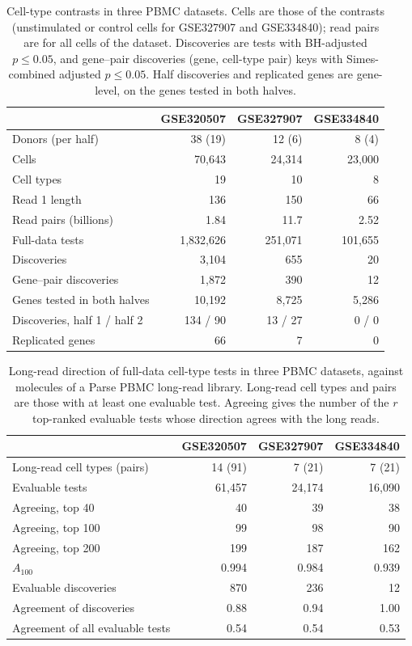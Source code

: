 \documentclass[11pt]{article}
\begin{document}
\begin{table}[ht]
\centering
\small
\begin{tabular}{lrrr}
\toprule
 & GSE320507 & GSE327907 & GSE334840\\
\midrule
Donors (per half) & 38 (19) & 12 (6) & 8 (4)\\
Cells & 70{,}643 & 24{,}314 & 23{,}000\\
Cell types & 19 & 10 & 8\\
Read 1 length & 136 & 150 & 66\\
Read pairs (billions) & 1.84 & 11.7 & 2.52\\
\midrule
Full-data tests & 1{,}832{,}626 & 251{,}071 & 101{,}655\\
Discoveries & 3{,}104 & 655 & 20\\
Gene--pair discoveries & 1{,}872 & 390 & 12\\
\midrule
Genes tested in both halves & 10{,}192 & 8{,}725 & 5{,}286\\
Discoveries, half 1 / half 2 & 134 / 90 & 13 / 27 & 0 / 0\\
Replicated genes & 66 & 7 & 0\\
\bottomrule
\end{tabular}
\caption{Cell-type contrasts in three PBMC datasets. Cells are those of the contrasts (unstimulated or control cells for GSE327907 and GSE334840); read pairs are for all cells of the dataset. Discoveries are tests with BH-adjusted $p\le0.05$, and gene--pair discoveries (gene, cell-type pair) keys with Simes-combined adjusted $p\le0.05$. Half discoveries and replicated genes are gene-level, on the genes tested in both halves.}
\label{tab:pbmc}
\end{table}

\begin{table}[ht]
\centering
\small
\begin{tabular}{lrrr}
\toprule
 & GSE320507 & GSE327907 & GSE334840\\
\midrule
Long-read cell types (pairs) & 14 (91) & 7 (21) & 7 (21)\\
Evaluable tests & 61{,}457 & 24{,}174 & 16{,}090\\
Agreeing, top 40 & 40 & 39 & 38\\
Agreeing, top 100 & 99 & 98 & 90\\
Agreeing, top 200 & 199 & 187 & 162\\
$A_{100}$ & 0.994 & 0.984 & 0.939\\
Evaluable discoveries & 870 & 236 & 12\\
Agreement of discoveries & 0.88 & 0.94 & 1.00\\
Agreement of all evaluable tests & 0.54 & 0.54 & 0.53\\
\bottomrule
\end{tabular}
\caption{Long-read direction of full-data cell-type tests in three PBMC datasets, against molecules of a Parse PBMC long-read library. Long-read cell types and pairs are those with at least one evaluable test. Agreeing gives the number of the $r$ top-ranked evaluable tests whose direction agrees with the long reads.}
\label{tab:pbmc-lr}
\end{table}
\end{document}
